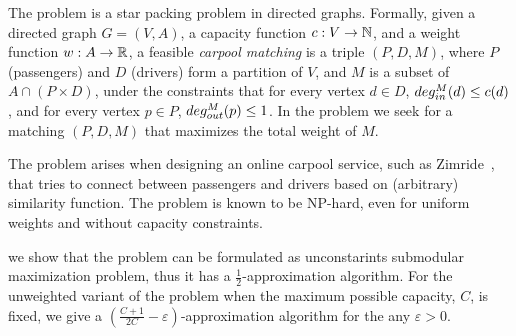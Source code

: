 The \textsc{\CARPOOL{}} problem is a star packing problem in directed graphs.
Formally, given a directed graph $G = (V, A)$,
a capacity function $ c: V \rightarrow \mathbb{N} $,
and a weight function $w : A \rightarrow \mathbb{R} $,
a feasible \emph{carpool matching} is a triple 
$(P, D, M)$, where $P$ (passengers) and $D$ (drivers) form a partition of $V$, 
and $M$ is a subset of $A \cap (P \times D)$,
under the constraints that for every vertex $d \in D$, 
$deg^M_{in}(d) \leq c(d)$, 
and for every vertex $p \in P$, $deg^M_{out}(p) \leq 1$.
In the \textsc{\CARPOOL{}} problem we seek for a matching $(P, D, M)$ that maximizes the
total weight of $M$.

The problem arises when designing an online carpool service, 
such as Zimride~\cite{zimride}, 
that tries to connect between passengers and drivers based on (arbitrary) similarity function.
The problem is known to be NP-hard, 
even for uniform weights and without capacity constraints.

we show that the problem can be formulated as
unconstarints submodular maximization problem, 
thus it has a $\frac{1}{2}$-approximation algorithm.
For the unweighted variant of the problem when the maximum possible capacity, $C$, is
fixed, we give a $(\frac{C + 1}{2C} - \varepsilon)$-approximation algorithm
for the any $\varepsilon > 0$.
